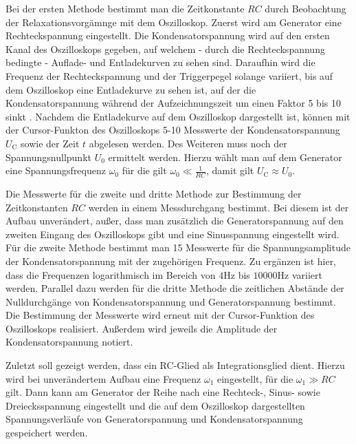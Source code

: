 Bei der ersten Methode bestimmt man die Zeitkonstante $RC$ durch Beobachtung der Relaxationsvorgämnge mit dem Oszilloskop.
Zuerst wird am Generator eine Rechteckspannung eingestellt.
Die Kondensatorspannung wird auf den ersten Kanal des Oszilloskops gegeben, auf welchem - durch
die Rechteckspannung bedingte - Auflade- und Entladekurven zu sehen sind.
Daraufhin wird die Frequenz der Rechteckspannung und der Triggerpegel solange variiert, bis
auf dem Oszilloskop eine Entladekurve zu sehen ist, auf der die Kondensatorspannung während der
Aufzeichnungszeit um einen Faktor 5 bis 10 sinkt \cite{Anleitung}.
Nachdem die Entladekurve auf dem Oszilloskop dargestellt ist, können mit der Cursor-Funkton
des Oszilloskops 5-10 Messwerte der Kondensatorspannung $U_{\text{C}}$ sowie der Zeit $t$
abgelesen werden.
Des Weiteren muss noch der Spannungsnullpunkt $U_0$ ermittelt werden.
Hierzu wählt man auf dem Generator eine Spannungsfrequenz $\omega_0$ für die gilt
$\omega_0 \ll \frac{1}{RC}$, damit gilt $U_{\text{C}} \approx U_0$.


Die Messwerte für die zweite und dritte Methode zur Bestimmung der Zeitkonstanten $RC$ werden
in einem Messdurchgang bestimmt.
Bei diesem ist der Aufbau unverändert, außer, dass man zusätzlich die Generatorspannung auf den zweiten Eingang des Oszilloskops gibt und eine Sinusspannung eingestellt wird.
Für die zweite Methode bestimmt man 15 Messwerte für die Spannungsamplitude der Kondensatorspannung mit der zugehörigen Frequenz. Zu ergänzen ist hier, dass die Frequenzen logarithmisch im Bereich von $4 \si{\Hz}$ bis $10000 \si{\Hz}$ variiert werden.
Parallel dazu %
werden für die dritte Methode die zeitlichen Abstände der Nulldurchgänge von Kondensatorspannung und Generatorspannung bestimmt.
Die Bestimmung der Messwerte wird erneut mit der Cursor-Funktion des Oszilloskops realisiert.
Außerdem wird jeweils die Amplitude der Kondensatorspannung notiert.

Zuletzt soll gezeigt werden, dass ein RC-Glied als Integrationsglied dient.
Hierzu wird bei unverändertem Aufbau eine Frequenz $\omega_1$ eingestellt, für die $\omega_1 \gg RC$ gilt. Dann kann am Generator der Reihe nach eine Rechteck-, Sinus- sowie Dreiecksspannung eingestellt und die auf dem Oszilloskop dargestellten Spannungsverläufe von Generatorspannung und Kondensatorspannung gespeichert werden.
